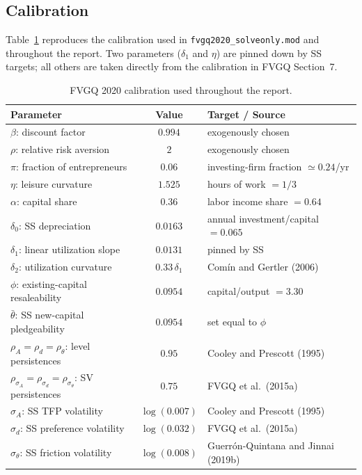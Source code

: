 \documentclass[11pt]{article}
\theoremstyle{plain}
\theoremstyle{definition}
\begin{document}
\subsection{Calibration}
\label{subsec:fvgq-calibration}

Table~\ref{tab:fvgq-calib} reproduces the calibration used in
\texttt{fvgq2020\_solveonly.mod} and throughout the report. Two parameters
($\delta_1$ and $\eta$) are pinned down by SS targets; all others are taken
directly from the calibration in FVGQ Section~7.

\begin{table}[h]
\centering
\caption{FVGQ 2020 calibration used throughout the report.}
\label{tab:fvgq-calib}
\begin{tabular}{lcl}
\toprule
Parameter & Value & Target / Source \\
\midrule
$\beta$: discount factor & $0.994$ & exogenously chosen \\
$\rho$: relative risk aversion & $2$ & exogenously chosen \\
$\pi$: fraction of entrepreneurs & $0.06$ & investing-firm fraction $\simeq 0.24$/yr \\
$\eta$: leisure curvature & $1.525$ & hours of work $=1/3$ \\
$\alpha$: capital share & $0.36$ & labor income share $=0.64$ \\
$\delta_0$: SS depreciation & $0.0163$ & annual investment/capital $=0.065$ \\
$\delta_1$: linear utilization slope & $0.0131$ & pinned by SS \\
$\delta_2$: utilization curvature & $0.33\,\delta_1$ & Com\'in and Gertler (2006) \\
$\phi$: existing-capital resaleability & $0.0954$ & capital/output $=3.30$ \\
$\bar\theta$: SS new-capital pledgeability & $0.0954$ & set equal to $\phi$ \\
$\rho_A=\rho_d=\rho_\theta$: level persistences & $0.95$ & Cooley and Prescott (1995) \\
$\rho_{\sigma_A}=\rho_{\sigma_d}=\rho_{\sigma_\theta}$: SV persistences & $0.75$ & FVGQ et al.\ (2015a) \\
$\sigma_A$: SS TFP volatility & $\log(0.007)$ & Cooley and Prescott (1995) \\
$\sigma_d$: SS preference volatility & $\log(0.032)$ & FVGQ et al.\ (2015a) \\
$\sigma_\theta$: SS friction volatility & $\log(0.008)$ & Guerr\'on-Quintana and Jinnai (2019b) \\
\bottomrule
\end{tabular}
\end{table}
\end{document}
